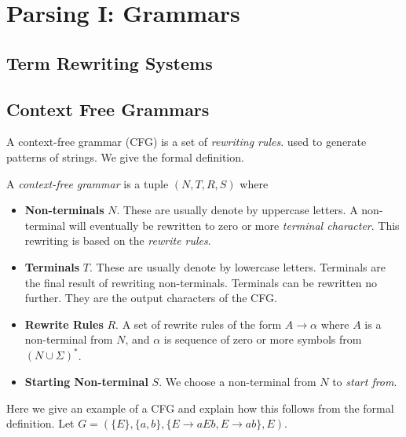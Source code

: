 
\chapter{Parsing I: Grammars}


\section{Term Rewriting Systems}

\section{Context Free Grammars}



A context-free grammar (CFG) is a set of \textit{rewriting rules}. 
used to generate patterns of strings. 
We give the formal definition. 

A \textit{context-free grammar} is a tuple $(N,T,R,S)$ 
where 
\begin{itemize}
\item \textbf{Non-terminals} $N$. These are usually denote by uppercase letters.
A non-terminal will eventually be rewritten to zero or more \textit{terminal character}. 
This rewriting is based on the \textit{rewrite rules}. 
\item \textbf{Terminals} $T$. These are usually denote by lowercase letters.
Terminals are the final result of rewriting non-terminals. Terminals can be rewritten no further. 
They are the output characters of the CFG. 
\item \textbf{Rewrite Rules} $R$. A set of rewrite rules of the form $A \rightarrow \alpha$ where 
$A$ is a non-terminal from $N$, and $\alpha$ is sequence of zero or more symbols from $(N \cup \Sigma)^{*}$. 
\item \textbf{Starting Non-terminal} $S$. We choose a non-terminal from $N$ to \textit{start from}.
\end{itemize}

\frmrule 

\begin{example}
Here we give an example of a CFG and explain how this follows from the formal definition.
Let $G = (\{E\},\{a,b\},\{E \rightarrow aEb, E \rightarrow ab\}, E)$. 

\end{example}

\frmrule 



